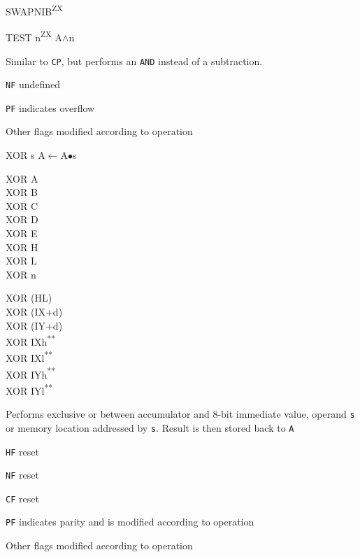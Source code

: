 \documentclass[twoside,openright,a4paper]{book}
\newcommand{\UNDOC}{\textnormal{\textsuperscript{**}}}
\newcommand{\ZXN}{\textnormal{\textsuperscript{ZX}}}
\begin{document}
\begin{basedescript}{
	\desclabelstyle{\multilinelabel}
	\desclabelwidth{3cm}}
\begin{detailitem}{SWAPNIB\ZXN}
		\begin{DetailTiming}
		\end{DetailTiming}

	\end{detailitem}

	\begin{detailitem}{TEST n\ZXN}
		{A$\wedge$n}

		Similar to {\tt CP}, but performs an {\tt AND} instead of a subtraction.

		\begin{DetailEffects}
			\item {\tt NF} undefined
			\item {\tt PF} indicates overflow
			\item Other flags modified according to operation
		\end{DetailEffects}
						
		\begin{DetailTiming}
			\DetailTime{}{3}{11}
		\end{DetailTiming}

	\end{detailitem}

	\begin{detailitem}{XOR s}
		{A$\leftarrow$A$\bullet$s}

		\begin{DetailVariants}
			XOR A\\
			XOR B\\
			XOR C\\
			XOR D\\
			XOR E\\
			XOR H\\
			XOR L\\
			XOR n

			\columnbreak
			XOR (HL)\\
			XOR (IX+d)\\
			XOR (IY+d)\\
			XOR IXh\UNDOC\\
			XOR IXl\UNDOC\\
			XOR IYh\UNDOC\\
			XOR IYl\UNDOC\\
		\end{DetailVariants}

		Performs exclusive or between accumulator and 8-bit immediate value, operand {\tt s} or memory location addressed by {\tt s}. Result is then stored back to {\tt A}

		\begin{DetailEffects}
			\item {\tt HF} reset
			\item {\tt NF} reset
			\item {\tt CF} reset
			\item {\tt PF} indicates parity and is modified according to operation
			\item Other flags modified according to operation
		\end{DetailEffects}
						

\end{detailitem}
\end{basedescript}
\end{document}
